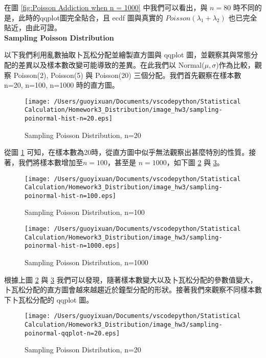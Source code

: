在圖 \ref{fig:Poisson Addiction when n = 1000} 中我們可以看出，與 $n=80$ 時不同的是，此時的qqplot圖完全貼合，且 ecdf 圖與真實的 $Poisson(\lambda_{1}+\lambda_{2})$ 也已完全貼近，由此可證。\\

\textbf{Sampling Poisson Distribution}

以下我們利用亂數抽取卜瓦松分配並繪製直方圖與 qqplot 圖，並觀察其與常態分配的差異以及樣本數改變可能導致的差異。在此我們以 Normal($\mu,\sigma$)作為比較，觀察 Poisson(2), Poisson(5) 與 Poisson(20) 三個分配。我們首先觀察在樣本數 n=20, n=100, n=1000 時的直方圖。

\begin{figure}[H]
    \centering
        \texttt{[image: /Users/guoyixuan/Documents/vscodepython/Statistical Calculation/Homework3\_Distribution/image\_hw3/sampling-poinormal-hist-n=20.eps]}
    \caption{Sampling Poisson Distribution, n=20}
    \label{fig:sampling-poinormal-hist-n=20}
\end{figure}

從圖 \ref{fig:sampling-poinormal-hist-n=20} 可知，在樣本數為20時，從直方圖中似乎無法觀察出甚麼特別的性質。接著，我們將樣本數增加至$n=100$，甚至是 $n=1000$，如下圖 \ref{fig:sampling-poinormal-hist-n=100} 與 \ref{fig:sampling-poinormal-hist-n=1000}。

\begin{figure}[H]
    \centering
        \texttt{[image: /Users/guoyixuan/Documents/vscodepython/Statistical Calculation/Homework3\_Distribution/image\_hw3/sampling-poinormal-hist-n=100.eps]}
    \caption{Sampling Poisson Distribution, n=100}
    \label{fig:sampling-poinormal-hist-n=100}
\end{figure}

\begin{figure}[H]
    \centering
        \texttt{[image: /Users/guoyixuan/Documents/vscodepython/Statistical Calculation/Homework3\_Distribution/image\_hw3/sampling-poinormal-hist-n=1000.eps]}
    \caption{Sampling Poisson Distribution, n=1000}
    \label{fig:sampling-poinormal-hist-n=1000}
\end{figure}

根據上圖 \ref{fig:sampling-poinormal-hist-n=100} 與 \ref{fig:sampling-poinormal-hist-n=1000} 我們可以發現，隨著樣本數變大以及卜瓦松分配的參數值變大，卜瓦松分配的直方圖會越來越趨近於鐘型分配的形狀。接著我們來觀察不同樣本數下卜瓦松分配的 qqplot 圖。

\begin{figure}[H]
    \centering
        \texttt{[image: /Users/guoyixuan/Documents/vscodepython/Statistical Calculation/Homework3\_Distribution/image\_hw3/sampling-poinormal-qqplot-n=20.eps]}
    \caption{Sampling Poisson Distribution, n=20}
    \label{fig:sampling-poinormal-qqplot-n=20}
\end{figure}

